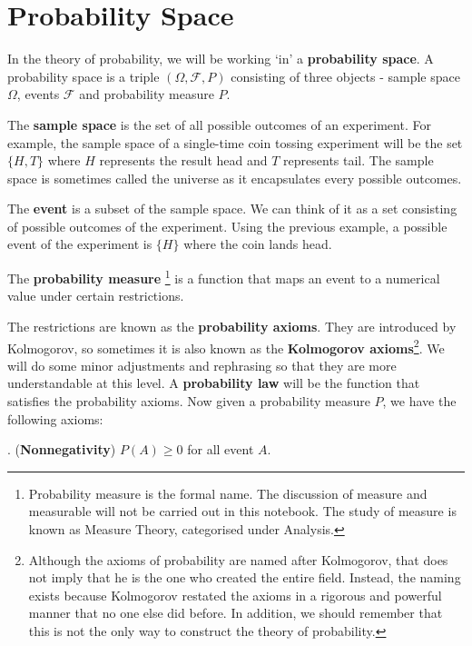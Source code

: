 \documentclass[11pt, a4paper, oneside]{book}
\theoremstyle{definition}
\begin{document}
\section{Probability Space}

In the theory of probability, we will be working `in' a \textbf{probability space}. A probability space is a triple $(\Omega, \mathcal{F}, P)$ consisting of three objects - {sample space} $\Omega$, {events} $\mathcal{F}$ and {probability measure} $P$. 

\noindent The \textbf{sample space} is the set of all possible outcomes of an experiment. For example, the sample space of a single-time coin tossing experiment will be the set $\{ H, T\}$ where $H$ represents the result head and $T$ represents tail. The sample space is sometimes called the universe  as it encapsulates every possible outcomes. 

\noindent The \textbf{event}  is a subset of the sample space. We can think of it as a set consisting of possible outcomes of the experiment. Using the previous example, a possible event of the experiment is $\{ H \}$ where the coin lands head. 

\noindent The \textbf{probability measure} \footnote{Probability measure is the formal name. The discussion of measure and measurable will not be carried out in this notebook. The study of measure is known as Measure Theory, categorised under Analysis.} is a function that maps an event to a numerical value under certain restrictions. 

\noindent The restrictions are known as the \textbf{probability axioms}. They are introduced by Kolmogorov, so sometimes it is also known as the \textbf{Kolmogorov axioms}\footnote{Although the axioms of probability are named after Kolmogorov, that does not imply that he is the one who created the entire field. Instead, the naming exists because Kolmogorov restated the axioms in a rigorous and powerful manner that no one else did before. In addition, we should remember that this is not the only way to construct the theory of probability.}. We will do some minor adjustments and rephrasing so that they are more understandable at this level. A \textbf{probability law} will be the function that satisfies the probability axioms. Now given a probability measure $P$, we have the following axioms:

. (\textbf{Nonnegativity}) $P(A) \ge 0$ for all event $A$.
\end{document}
